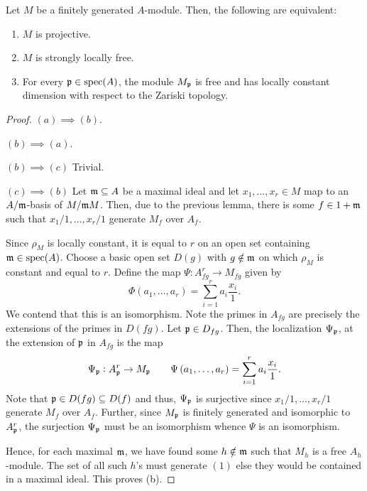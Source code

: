 \begin{lemma}
    Let $M$ be a finitely generated $A$-module. Then, the following are equivalent:
    \begin{enumerate}[label=(\alph*)]
        \item $M$ is projective. 
        \item $M$ is strongly locally free. 
        \item For every $\mathfrak p\in\operatorname{spec}(A)$, the module $M_\mathfrak p$ is free and has locally constant dimension with respect to the Zariski topology.
    \end{enumerate}
\end{lemma}
\begin{proof}
$(a)\implies(b)$.

$(b)\implies(a)$. 

$(b)\implies(c)$ Trivial.

$(c)\implies(b)$ Let $\mathfrak m\subseteq A$ be a maximal ideal and let $x_1,\dots,x_r\in M$ map to an $A/\mathfrak m$-basis of $M/\mathfrak m M$. Then, due to the previous lemma, there is some $f\in 1 + \mathfrak m$ such that $x_1/1,\dots,x_r/1$ generate $M_f$ over $A_f$.

Since $\rho_M$ is locally constant, it is equal to $r$ on an open set containing $\mathfrak m\in\operatorname{spec}(A)$. Choose a basic open set $D(g)$ with $g\notin\mathfrak m$ on which $\rho_M$ is constant and equal to $r$. Define the map $\Psi: A_{fg}^r\to M_{fg}$ given by 
\begin{equation*}
    \Phi\left(a_1,\dots, a_r\right) = \sum_{i = 1}^r a_i\frac{x_i}{1}.
\end{equation*}
We contend that this is an isomorphism. Note the primes in $A_{fg}$ are precisely the extensions of the primes in $D(fg)$. Let $\mathfrak p\in D_{fg}$. Then, the localization $\Psi_{\mathfrak p}$, at the extension of $\mathfrak p$ in $A_{fg}$ is the map 
\begin{equation*}
    \Psi_{\mathfrak p}: A_{\mathfrak p}^r\to M_\mathfrak p\qquad\Psi\left(a_1,\dots,a_r\right) = \sum_{i = 1}^r a_i\frac{x_i}{1}.
\end{equation*}
Note that $\mathfrak p\in D(fg)\subseteq D(f)$ and thus, $\Psi_\mathfrak p$ is surjective since $x_1/1,\dots,x_r/1$ generate $M_f$ over $A_f$. Further, since $M_\mathfrak p$ is finitely generated and isomorphic to $A_\mathfrak p^r$, the surjection $\Psi_\mathfrak p$ must be an isomorphism whence $\Psi$ is an isomorphism. 

Hence, for each maximal $\mathfrak m$, we have found some $h\notin\mathfrak m$ such that $M_h$ is a free $A_h$-module. The set of all such $h$'s must generate $(1)$ else they would be contained in a maximal ideal. This proves (b).
\end{proof}